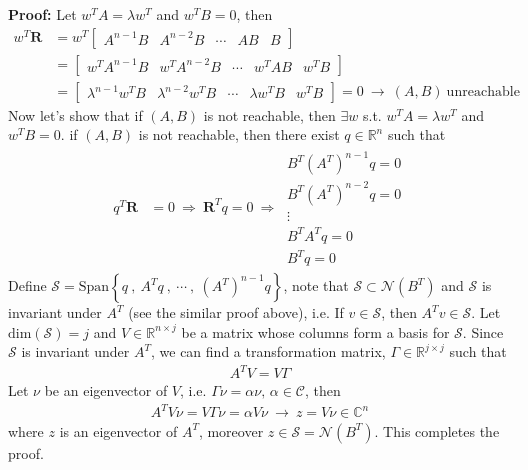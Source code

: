 \documentclass[twoside]{article}
\begin{document}
\textbf{Proof:} Let $w^T A = \lambda w^T$ and $w^T B = 0$, then
%
\begin{align*}
 w^T \mathbf{R} &= w^T \left[ \begin{array}{c|c|c|c|c} A^{n-1} B & A^{n-2} B &
         \cdots & A B & B \end{array} \right] 
         \\
  &= \left[ \begin{array}{c|c|c|c|c} w^T A^{n-1} B & w^T A^{n-2} B &
         \cdots & w^T A B & w^T B \end{array} \right] 
         \\
&= \left[ \begin{array}{c|c|c|c|c} \lambda^{n-1} w^T B & \lambda^{n-2} w^T B &
         \cdots & \lambda w^T  B & w^T B \end{array} \right] = 0 \ \rightarrow \ (A,B) \ \mathrm{unreachable} 
\end{align*}
%
Now let's show that if $(A,B)$ is not reachable, then $\exists w$ s.t. $w^T A = \lambda w^T$ and $w^T B = 0$.  if $(A,B)$ is not reachable, then there exist $q \in \mathbb{R}^n$ such that
%
\begin{align*}
q^T \mathbf{R} &= 0 \ \Rightarrow \ \mathbf{R}^T q = 0 
\ \Rightarrow \ \begin{array}{c} B^T (A^T)^{n-1} q = 0 \\ B^T (A^T)^{n-2} q = 0 \\
         \vdots \\ B^T A^T q = 0 \\ B^T q = 0 \end{array} 
\end{align*}
%
Define $\mathcal{S} = \mathrm{Span} \left\lbrace q \ , \ A^T q \ , \ \cdots \ , \  (A^T)^{n-1} q \right\rbrace$, note that 
$\mathcal{S} \subset \mathcal{N}(B^T)$ and $\mathcal{S}$ is invariant under $A^T$ (see the similar proof above), i.e. 
If $v \in \mathcal{S}$, then $A^T v \in \mathcal{S}$. Let $\mathrm{dim} (\mathcal{S}) = j$ and $V \in \mathbb{R}^{n \times j}$ 
be a matrix whose columns form a basis for $\mathcal{S}$. Since $\mathcal{S}$ is invariant under $A^T$, we can find a transformation
matrix, $\Gamma \in \mathbb{R}^{j \times j}$ such that 
%
\begin{align*}
A^T V = V \Gamma
\end{align*}
%
Let $\nu$ be an eigenvector of $V$, i.e. $\Gamma \nu = \alpha \nu , \, \alpha \in \mathcal{C}$, then 
%
\begin{align*}
A^T V \nu = V \Gamma \nu = \alpha V \nu \ \rightarrow \ z = V \nu \in \mathbb{C}^n
\end{align*}
%
where $z$ is an eigenvector of $A^T$, moreover $z \in \mathcal{S} = \mathcal{N}(B^T)$. This completes the proof. 
\end{document}
